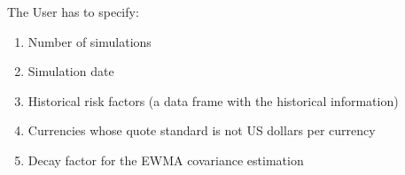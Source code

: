 \documentclass[letterpaper,10pt,english]{/anaconda/lib/python2.7/site-packages/sphinx/texinputs/sphinxhowto}
\begin{document}
The User has to specify:

\begin{enumerate}
\def\labelenumi{\arabic{enumi}.}
\itemsep1pt\parskip0pt
\item
  Number of simulations
\item
  Simulation date
\item
  Historical risk factors (a data frame with the historical information)
\item
  Currencies whose quote standard is not US dollars per currency
\item
  Decay factor for the EWMA covariance estimation
\end{enumerate}

\end{document}
